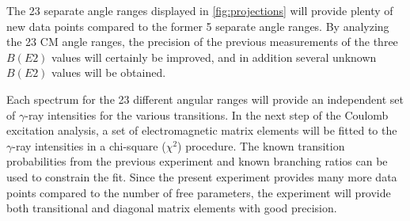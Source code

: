 \documentclass[twoside,english]{uiofysmaster/uiofysmaster}
\newcommand{\ga}{$\gamma$}
\let\orgautoref\autoref
\renewcommand{\autoref}
        {%
		 \def\sectionautorefname{Section}%
		 \def\subsectionautorefname{Section}%
		 \def\subsubsectionautorefname{Section}%
		 \def\chapterautorefname{Chapter}%
          \orgautoref}
\begin{document}
The 23 separate angle ranges displayed in \autoref{fig:projections} will provide plenty of new data points compared to the former 5 separate angle ranges.
By analyzing the 23 CM angle ranges, the precision of the previous measurements of the three $B(E2)$ values will certainly be improved, and in addition several unknown $B(E2)$ values will be obtained.

Each spectrum for the 23 different angular ranges will provide an independent set of \ga-ray intensities for the various transitions. 
In the next step of the Coulomb excitation analysis, a set of electromagnetic matrix elements will be fitted to the \ga-ray intensities in a chi-square ($\chi^2$) procedure. 
The known transition probabilities from the previous experiment and known branching ratios can be used to constrain the fit. 
Since the present experiment provides many more data points compared to the number of free parameters, the experiment will provide both transitional and diagonal matrix elements with good precision. 
\end{document}
